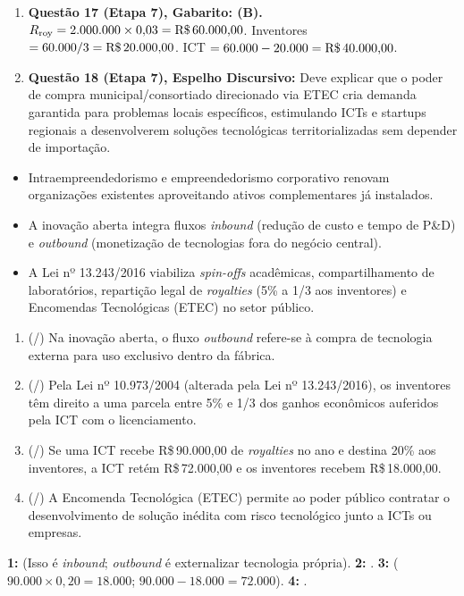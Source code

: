 \begin{boxGabarito}
\begin{enumerate}[leftmargin=1.5em, itemsep=4pt]
    \item \textbf{Questão 17 (Etapa 7), Gabarito: (B).} $R_{\text{roy}} = 2.000.000 \times 0{,}03 = \text{R\$\,60.000,00}$. Inventores $= 60.000 / 3 = \text{R\$\,20.000,00}$. ICT $= 60.000 - 20.000 = \text{R\$\,40.000,00}$.
    \item \textbf{Questão 18 (Etapa 7), Espelho Discursivo:} Deve explicar que o poder de compra municipal/consortiado direcionado via ETEC cria demanda garantida para problemas locais específicos, estimulando ICTs e startups regionais a desenvolverem soluções tecnológicas territorializadas sem depender de importação.
  \end{enumerate}
\end{boxGabarito}

\begin{boxResumo}
  \begin{itemize}[leftmargin=1.4em, itemsep=2pt]
    \item Intraempreendedorismo e empreendedorismo corporativo renovam organizações existentes aproveitando ativos complementares já instalados.
    \item A inovação aberta integra fluxos \textit{inbound} (redução de custo e tempo de P\&D) e \textit{outbound} (monetização de tecnologias fora do negócio central).
    \item A Lei nº 13.243/2016 viabiliza \textit{spin-offs} acadêmicas, compartilhamento de laboratórios, repartição legal de \textit{royalties} (5\% a 1/3 aos inventores) e Encomendas Tecnológicas (ETEC) no setor público.
  \end{itemize}
\end{boxResumo}

\begin{boxTeste}
  \begin{enumerate}[leftmargin=1.5em, itemsep=4pt]
    \item (\V/\F) Na inovação aberta, o fluxo \textit{outbound} refere-se à compra de tecnologia externa para uso exclusivo dentro da fábrica.
    \item (\V/\F) Pela Lei nº 10.973/2004 (alterada pela Lei nº 13.243/2016), os inventores têm direito a uma parcela entre 5\% e 1/3 dos ganhos econômicos auferidos pela ICT com o licenciamento.
    \item (\V/\F) Se uma ICT recebe R\$\,90.000,00 de \textit{royalties} no ano e destina 20\% aos inventores, a ICT retém R\$\,72.000,00 e os inventores recebem R\$\,18.000,00.
    \item (\V/\F) A Encomenda Tecnológica (ETEC) permite ao poder público contratar o desenvolvimento de solução inédita com risco tecnológico junto a ICTs ou empresas.
  \end{enumerate}
  \begin{boxGabarito}
    \textbf{1: \F} (Isso é \textit{inbound}; \textit{outbound} é externalizar tecnologia própria). \quad \textbf{2: \V}. \quad \textbf{3: \V} ($90.000 \times 0{,}20 = 18.000$; $90.000 - 18.000 = 72.000$). \quad \textbf{4: \V}.
  \end{boxGabarito}
\end{boxTeste}
